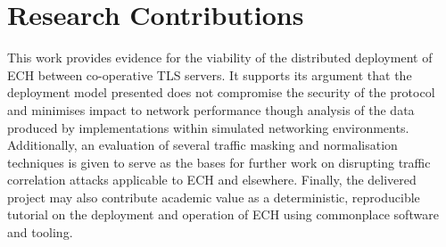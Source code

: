 \section{Research Contributions}

This work provides evidence for the viability of the distributed deployment of ECH between co-operative TLS servers. It supports its argument that the deployment model presented does not compromise the security of the protocol and minimises impact to network performance though analysis of the data produced by implementations within simulated networking environments. Additionally, an evaluation of several traffic masking and normalisation techniques is given to serve as the bases for further work on disrupting traffic correlation attacks applicable to ECH and elsewhere. Finally, the delivered project may also contribute academic value as a deterministic, reproducible tutorial on the deployment and operation of ECH using commonplace software and tooling.
